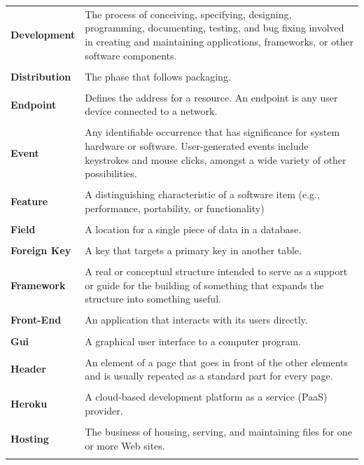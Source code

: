 \documentclass[a4paper,11pt,twoside]{report}
\theoremstyle{definition}
\begin{document}
\begin{longtable}{p{4cm} p{11cm}}
\textbf{Development} & The process of conceiving, specifying, designing, programming, documenting, testing, and bug fixing involved in creating and maintaining applications, frameworks, or other software components. \\ \\
\textbf{Distribution} & The phase that follows packaging.\\ \\
\textbf{Endpoint} & Defines the address for a resource. An endpoint is any user device connected to a network.\\ \\
\textbf{Event} & Any identifiable occurrence that has significance for system hardware or software. User-generated events include keystrokes and mouse clicks, amongst a wide variety of other possibilities.\\ \\
\textbf{Feature} & A distinguishing characteristic of a software item (e.g., performance, portability, or functionality)\\ \\
\textbf{Field} & A location for a single piece of data in a database.\\ \\
\textbf{Foreign Key} & A key that targets a primary key in another table.\\ \\
\textbf{Framework} & A real or conceptual structure intended to serve as a support or guide for the building of something that expands the structure into something useful.\\ \\
\textbf{Front-End} & An application that interacts with its users directly.\\ \\
\textbf{Gui} & A graphical user interface to a computer program.\\ \\
\textbf{Header} & An element of a page that goes in front of the other elements and is usually repeated as a standard part for every page. \\ \\
\textbf{Heroku} & A cloud-based development platform as a service (PaaS) provider.\\ \\
\textbf{Hosting} & The business of housing, serving, and maintaining files for one or more Web sites. \\ \\

\end{longtable}
\end{document}
